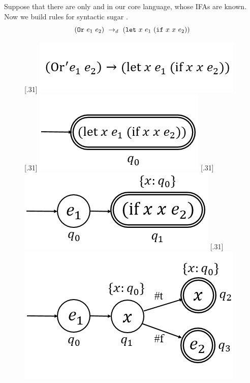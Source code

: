 \begin{example}

    Suppose that there are only  and  in our core language, whose IFAs are known. Now we build rules for syntactic sugar .
    \[
        (\mbox{\tt Or}~e_1~e_2) ~\rightarrow_d~ (\mbox{\tt let}~x~e_1~(\mbox{\tt if}~x~x~e_2))
    \]

    \begin{figure}[t]
        \centering
        [.31\linewidth]{
            \includegraphics[scale=0.3]{images/ifa/ifa-ex-or-1.png}
        }
        [.31\linewidth]{
            \includegraphics[scale=0.3]{images/ifa/ifa-ex-or-2.png}
        }
        [.31\linewidth]{
            \includegraphics[scale=0.3]{images/ifa/ifa-ex-or-3.png}
        }
        [.31\linewidth]{
            \includegraphics[scale=0.3]{images/ifa/ifa-ex-or-4.png}
}
\end{figure}
\end{example}
